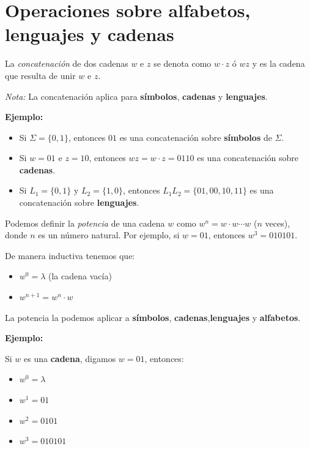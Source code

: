 \section{Operaciones sobre alfabetos, lenguajes y cadenas}

\begin{Def}
La \textit{concatenación} de dos cadenas $w$ e $z$ se denota como $w \cdot z$ ó $wz$ y es la cadena 
que resulta de unir $w$ e $z$. 

\textit{Nota:} La concatenación aplica para \textbf{símbolos}, \textbf{cadenas} y \textbf{lenguajes}.
\end{Def}

\textbf{Ejemplo:}

\begin{itemize}
\item Si $\Sigma = \{0,1\}$, entonces $01$ es una concatenación sobre \textbf{símbolos} de $\Sigma$.
\item Si $w = 01$ e $z = 10$, entonces $wz = w \cdot z = 0110$ es una concatenación sobre \textbf{cadenas}.
\item Si $L_1 = \{0,1\}$ y $L_2 = \{1,0\}$, entonces $L_1L_2 = \{01, 00, 10, 11\}$ es una concatenación sobre \textbf{lenguajes}.
\end{itemize}

\begin{Def}
Podemos definir la \textit{potencia} de una cadena $w$ como $w^n = w \cdot w \cdots w$ ($n$ veces), donde $n$ es un número natural. Por ejemplo, si $w = 01$, entonces $w^3 = 010101$.

De manera inductiva tenemos que:

\begin{itemize}
    \item $w^0 = \lambda$ (la cadena vacía)
    \item $w^{n+1} = w^n \cdot w$
\end{itemize}

La potencia la podemos aplicar a \textbf{símbolos}, \textbf{cadenas},\textbf{lenguajes} y \textbf{alfabetos}.
\end{Def}

\textbf{Ejemplo:}

Si $w$ es una \textbf{cadena}, digamos $w = 01$, entonces:

\begin{itemize}
    \item $w^0 = \lambda$
    \item $w^1 = 01$
    \item $w^2 = 0101$
    \item $w^3 = 010101$
\end{itemize}


